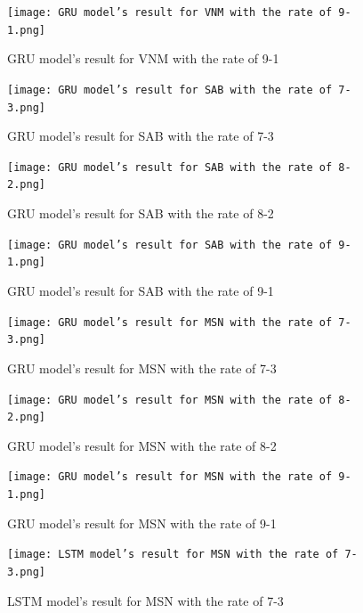 \documentclass{ieeeojies}
\begin{document}
    \begin{figure}[H]
    
    \begin{minipage}{0.23\textwidth}
    \centering
    \texttt{[image: GRU model’s result for VNM with the rate of 9-1.png]}
    \caption{GRU model’s result for VNM with the rate of 9-1}
    \end{minipage}   
   \hfill
    \centering
    \begin{minipage}{0.23\textwidth}
    \centering
    \texttt{[image: GRU model’s result for SAB with the rate of 7-3.png]}
    \caption{GRU model’s result for SAB with the rate of 7-3}
    \end{minipage}
     \end{figure}
     
     \begin{figure}[H]
    \begin{minipage}{0.23\textwidth}
    \centering
    \texttt{[image: GRU model’s result for SAB with the rate of 8-2.png]}
    \caption{GRU model’s result for SAB with the rate of 8-2}
    \end{minipage}
    \hfill
    \begin{minipage}{0.23\textwidth}
    \centering
    \texttt{[image: GRU model’s result for SAB with the rate of 9-1.png]}
    \caption{GRU model’s result for SAB with the rate of 9-1}
    \end{minipage}
    \end{figure}
    \begin{figure}[H]
    \begin{minipage}{0.23\textwidth}
    \centering
    \texttt{[image: GRU model’s result for MSN with the rate of 7-3.png]}
    \caption{GRU model’s result for MSN with the rate of 7-3}
    \end{minipage}   
    \hfill
    \begin{minipage}{0.23\textwidth}
    \centering
    \texttt{[image: GRU model’s result for MSN with the rate of 8-2.png]}
    \caption{GRU model’s result for MSN with the rate of 8-2}
    \end{minipage}
    \end{figure}
    
   \begin{figure}[H]

    \begin{minipage}{0.23\textwidth}
    \centering
    \texttt{[image: GRU model’s result for MSN with the rate of 9-1.png]}
    \caption{GRU model’s result for MSN with the rate of 9-1}
    \end{minipage}
    \hfill
    \begin{minipage}{0.23\textwidth}
    \centering
    \texttt{[image: LSTM model’s result for MSN with the rate of 7-3.png]}
    \caption{LSTM model’s result for MSN with the rate of 7-3}
    \end{minipage}
    \end{figure}
    
\end{document}
